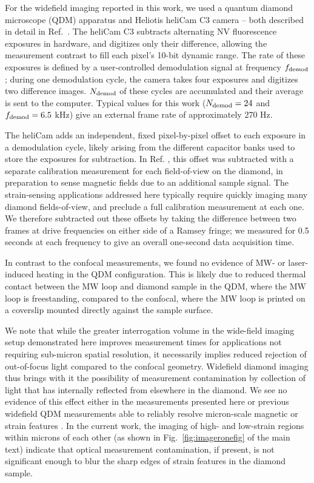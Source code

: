 \documentclass[reprint,superscriptaddress,hyphens,amsmath,amssymb,aps,prx,float]{revtex4-2}
\begin{document}
For the widefield imaging reported in this work, we used a quantum diamond microscope (QDM) apparatus and Heliotis heliCam C3 camera -- both described in detail in Ref.~\cite{DQ4R}.  The heliCam C3 subtracts alternating NV fluorescence exposures in hardware, and digitizes only their difference, allowing the measurement contrast to fill each pixel's 10-bit dynamic range. The rate of these exposures is defined by a user-controlled demodulation signal at frequency $f_{\rm{demod}}$; during one demodulation cycle, the camera takes four exposures and digitizes two difference images.  $N_{\rm demod}$ of these cycles are accumulated and their average is sent to the computer.  Typical values for this work ($N_{\rm demod} = 24$ and $f_{\rm demod} = 6.5 $ kHz) give an external frame rate of approximately 270 Hz.

The heliCam adds an independent, fixed pixel-by-pixel offset to each exposure in a demodulation cycle, likely arising from the different capacitor banks used to store the exposures for subtraction. In Ref. \cite{DQ4R}, this offset was subtracted with a separate calibration measurement for each field-of-view on the diamond, in preparation to sense magnetic fields due to an additional sample signal.  The strain-sensing applications addressed here typically require quickly imaging many diamond fields-of-view, and preclude a full calibration measurement at each one.  We therefore subtracted out these offsets by taking the difference between two frames at drive frequencies on either side of a Ramsey fringe; we measured for 0.5 seconds at each frequency to give an overall one-second data acquisition time.

In contrast to the confocal measurements, we found no evidence of MW- or laser-induced heating in the QDM configuration.  This is likely due to reduced thermal contact between the MW loop and diamond sample in the QDM, where the MW loop is freestanding, compared to the confocal, where the MW loop is printed on a coverslip mounted directly against the sample surface.

We note that while the greater interrogation volume in the wide-field imaging setup demonstrated here improves measurement times for applications not requiring sub-micron spatial resolution, it necessarily implies reduced rejection of out-of-focus light compared to the confocal geometry.  Widefield diamond imaging thus brings with it the possibility of measurement contamination by collection of light that has internally reflected from elsewhere in the diamond.  We see no evidence of this effect either in the measurements presented here or previous widefield QDM measurements able to reliably resolve micron-scale magnetic or strain features  \cite{DQ4R, QDMreview,GlennGGG,StrainPaper,GlennMTB2015,OpticalMagneticImagingLivingCells}.  In the current work, the imaging of high- and low-strain regions within microns of each other (as shown in Fig.~\ref{fig:imageronefig} of the main text) indicate that optical measurement contamination, if present, is not significant enough to blur the sharp edges of strain features in the diamond sample.
\end{document}
